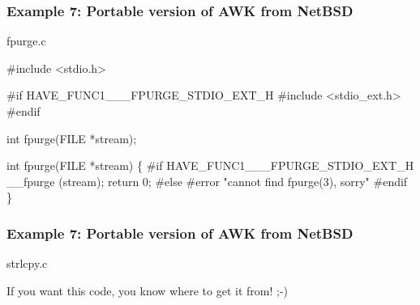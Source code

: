 \documentclass[hyperref={colorlinks=true}]{beamer}
\begin{document}
\begin{frame}[fragile]
  \frametitle{Example 7: Portable version of AWK from NetBSD}

\begin{block}{fpurge.c}
\begin{CodeNoLabelSmallest}
#include <stdio.h>

#if HAVE\_FUNC1\_\_\_FPURGE\_STDIO\_EXT\_H
#include <stdio\_ext.h>
#endif

int fpurge(FILE *stream);

int fpurge(FILE *stream)
\{
#if HAVE\_FUNC1\_\_\_FPURGE\_STDIO\_EXT\_H
  \_\_fpurge (stream);
  return 0;
#else
#error "cannot find fpurge(3), sorry"
#endif
\}
\end{CodeNoLabelSmallest}
\end{block}
\end{frame}

\begin{frame}[fragile]
  \frametitle{Example 7: Portable version of AWK from NetBSD}

\begin{block}{strlcpy.c}
\begin{CodeNoLabel}
If you want this code, you know where to get it from! ;-)
\end{CodeNoLabel}
\end{block}
\end{frame}
\end{document}
